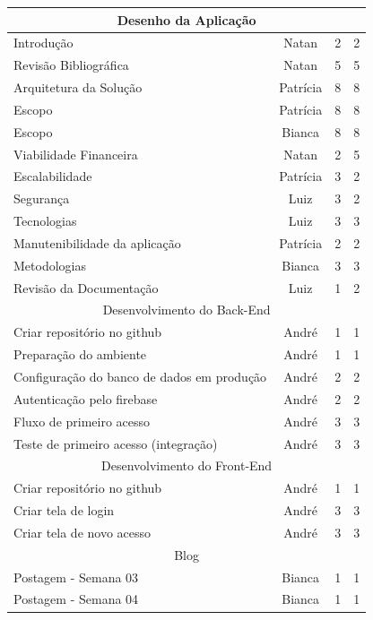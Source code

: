 \documentclass[
    12pt,               %
    openright,          %
    oneside,
    a4paper,            %
    english,            %
    brazil              %
    ]{ifsp-spo-inf-ctds} %
\begin{document}
\begin{apendicesenv}
\begin{quadro}[htb]
\begin{tabular}{|l|c|c|c|}
    \multicolumn{4}{|c|}{Desenho da Aplicação} \\ \hline
    Introdução  & Natan & 2 & 2   \\ \hline 
    Revisão Bibliográfica  & Natan & 5 & 5   \\ \hline 
    Arquitetura da Solução  & Patrícia & 8  & 8   \\ \hline 
    Escopo  & Patrícia & 8 & 8   \\ \hline 
    Escopo  & Bianca & 8  & 8   \\ \hline 
    Viabilidade Financeira  & Natan & 2  & 5   \\ \hline 
    Escalabilidade  & Patrícia & 3  & 2  \\ \hline 
    Segurança  & Luiz & 3 &  2  \\ \hline 
    Tecnologias  & Luiz & 3 & 3   \\ \hline 
    Manutenibilidade da aplicação  & Patrícia & 2  & 2   \\ \hline 
    Metodologias  & Bianca & 3  & 3   \\ \hline 
    Revisão da Documentação  & Luiz & 1  & 2\\ \hline 
    
    \multicolumn{4}{|c|}{Desenvolvimento do Back-End} \\ \hline
    Criar repositório no github & André & 1  &  1  \\ \hline 
    Preparação do ambiente & André & 1  &  1  \\ \hline 
    Configuração do banco de dados em produção & André & 2  & 2   \\ \hline 
    Autenticação pelo firebase & André & 2  & 2   \\ \hline 
    Fluxo de primeiro acesso & André & 3  & 3   \\ \hline 
    Teste de primeiro acesso (integração) & André & 3  & 3  \\ \hline 
    
    \multicolumn{4}{|c|}{Desenvolvimento do Front-End} \\ \hline
    Criar repositório no github & André & 1  & 1  \\ \hline 
    Criar tela de login & André & 3  & 3   \\ \hline 
    Criar tela de novo acesso & André & 3  & 3 \\ \hline 
    
    \multicolumn{4}{|c|}{Blog} \\ \hline
    Postagem - Semana 03      & Bianca    & 1  & 1    \\ \hline
    Postagem - Semana 04      & Bianca     & 1  & 1  \\ \hline
    

\end{tabular}
\end{quadro}
\end{apendicesenv}
\end{document}
